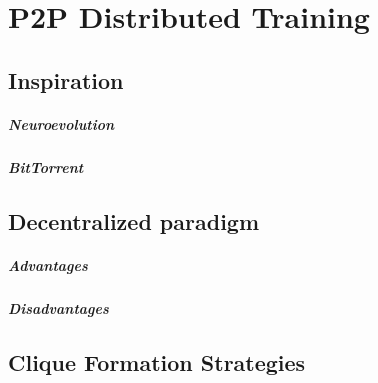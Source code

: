 \chapter{P2P Distributed Training}
\label{chapter:body}
\thispagestyle{myheadings}

\graphicspath{{2_Body/Figures/}}

\section{Inspiration}
\paragraph{Neuroevolution}
\paragraph{BitTorrent}

\section{Decentralized paradigm}
\paragraph{Advantages}
\paragraph{Disadvantages}

\section{Clique Formation Strategies}
